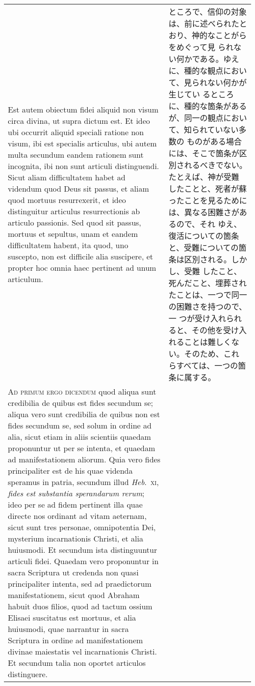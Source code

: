 \documentclass[10pt]{jsarticle} %
\begin{document}
\begin{longtable}{p{21em}p{21em}}
\\



Est autem obiectum fidei aliquid non
visum circa divina, ut supra dictum est. Et ideo ubi occurrit aliquid
speciali ratione non visum, ibi est specialis articulus, ubi autem multa
secundum eandem rationem sunt incognita, ibi non sunt articuli
distinguendi. Sicut aliam difficultatem habet ad videndum quod Deus sit
passus, et aliam quod mortuus resurrexerit, et ideo distinguitur
articulus resurrectionis ab articulo passionis. Sed quod sit passus,
mortuus et sepultus, unam et eandem difficultatem habent, ita quod, uno
suscepto, non est difficile alia suscipere, et propter hoc omnia haec
pertinent ad unum articulum.


&


ところで、信仰の対象は、前に述べられたとおり、神的なことがらをめぐって見
 られない何かである。ゆえに、種的な観点において、見られない何かが生じてい
 るところに、種的な箇条があるが、同一の観点において、知られていない多数の
 ものがある場合には、そこで箇条が区別されるべきでない。たとえば、神が受難
 したことと、死者が蘇ったことを見るためには、異なる困難さがあるので、それ
 ゆえ、復活についての箇条と、受難についての箇条は区別される。しかし、受難
 したこと、死んだこと、埋葬されたことは、一つで同一の困難さを持つので、一
 つが受け入れられると、その他を受け入れることは難しくない。そのため、これ
 らすべては、一つの箇条に属する。

\\


{\scshape Ad primum ergo dicendum} quod aliqua sunt
credibilia de quibus est fides secundum se; aliqua vero sunt credibilia
de quibus non est fides secundum se, sed solum in ordine ad alia, sicut
etiam in aliis scientiis quaedam proponuntur ut per se intenta, et
quaedam ad manifestationem aliorum. Quia vero fides principaliter est de
his quae videnda speramus in patria, secundum illud {\itshape Heb}.~{\scshape xi}, {\itshape fides est
substantia sperandarum rerum}; ideo per se ad fidem pertinent illa quae
directe nos ordinant ad vitam aeternam, sicut sunt tres personae,
omnipotentia Dei, mysterium incarnationis Christi, et alia huiusmodi. Et
secundum ista distinguuntur articuli fidei. Quaedam vero proponuntur in
sacra Scriptura ut credenda non quasi principaliter intenta, sed ad
praedictorum manifestationem, sicut quod Abraham habuit duos filios,
quod ad tactum ossium Elisaei suscitatus est mortuus, et alia huiusmodi,
quae narrantur in sacra Scriptura in ordine ad manifestationem divinae
maiestatis vel incarnationis Christi. Et secundum talia non oportet
articulos distinguere.


\end{longtable}
\end{document}
